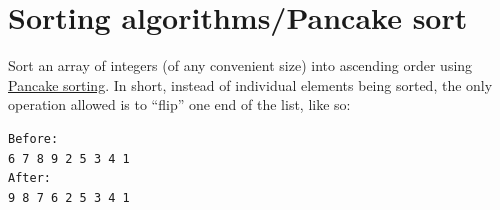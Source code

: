 








\pagebreak{}
\section*{Sorting algorithms/Pancake sort}

Sort an array of integers (of any convenient size) into ascending order
using \href{http://en.wikipedia.org/wiki/Pancake\_sorting}{Pancake
sorting}. In short, instead of individual elements being sorted, the
only operation allowed is to ``flip'' one end of the list, like so:

\begin{verbatim}
Before:
6 7 8 9 2 5 3 4 1
After:
9 8 7 6 2 5 3 4 1
\end{verbatim}

